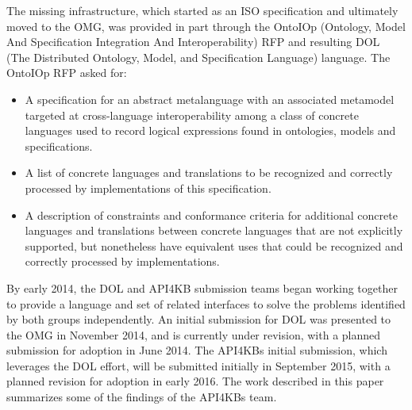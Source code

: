 \documentclass[runningheads]{llncs}
\begin{document}
The missing infrastructure, which started as an ISO specification and ultimately moved to the OMG, was provided in part through the OntoIOp (Ontology, Model And Specification Integration And Interoperability) RFP \cite{OntoIOp} and resulting DOL (The Distributed Ontology,
Model, and Specification
Language) language. The OntoIOp RFP asked for:
\begin {itemize}
\item A specification for an abstract metalanguage with an associated metamodel targeted at cross-language interoperability among a class of concrete languages used to record logical expressions found in ontologies, models and specifications.
\item A list of concrete languages and translations to be recognized and correctly processed by implementations of this specification. 
\item A description of constraints and conformance criteria for additional concrete languages and translations between concrete languages that are not explicitly supported, but nonetheless have equivalent uses that could be recognized and correctly processed by implementations.
\end{itemize}

By early 2014, the DOL and API4KB submission teams began working together to provide a language and set of related interfaces to solve the problems identified by both groups independently. An initial submission for DOL \cite{DOL} was presented to the OMG in November 2014, and is currently under revision, with a planned submission for adoption in June 2014.  The API4KBs initial submission, which leverages the DOL effort, will be submitted initially in September 2015, with a planned revision for adoption in early 2016.  The work described in this paper summarizes some of the findings of the API4KBs team.












\end{document}
